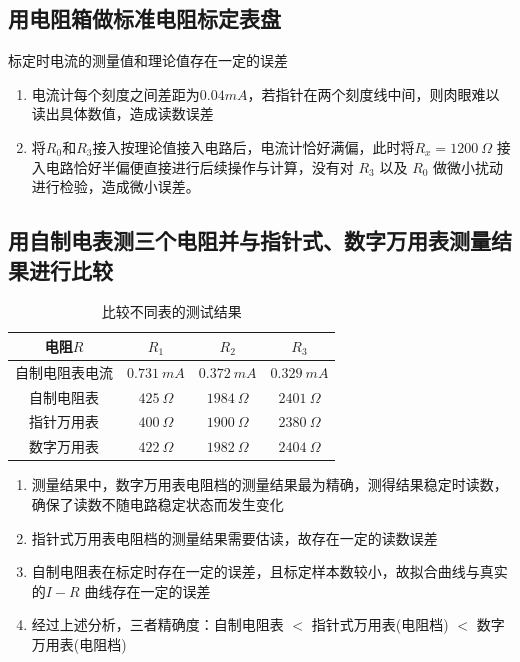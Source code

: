 \documentclass[UTF8]{ctexart}
\begin{document}
\subsection{用电阻箱做标准电阻标定表盘}
标定时电流的测量值和理论值存在一定的误差
\begin{enumerate}
    \item 电流计每个刻度之间差距为$0.04mA$，若指针在两个刻度线中间，则肉眼难以读出具体数值，造成读数误差
    \item 将$R_0$和$R_3$接入按理论值接入电路后，电流计恰好满偏，此时将$R_x =1200 \ \Omega$ 接入电路恰好半偏便直接进行后续操作与计算，没有对 $R_3$ 以及 $R_0$ 做微小扰动进行检验，造成微小误差。 
\end{enumerate}




\subsection{用自制电表测三个电阻并与指针式、数字万用表测量结果进行比较}
\begin{table}[H]
    \centering
    \caption*{比较不同表的测试结果}
    \begin{tabular}{|c|c|c|c|}
    \hline
      电阻$R$ &  $R_1$   &  $R_2$  &  $R_3$  \\
     \hline
     自制电阻表电流  &  $0.731\ mA$  & $0.372\ mA$  & $0.329\ mA$ \\
     \hline
     自制电阻表   & $425 \ \Omega$  & $1984 \ \Omega$ &  $2401 \ \Omega$ \\
     \hline
     指针万用表  &  $400 \ \Omega$  &  $1900\ \Omega$  & $2380\ \Omega$  \\
     \hline
     数字万用表  &  $422\ \Omega$  & $1982\ \Omega$  &  $2404\ \Omega$  \\
     \hline
    \end{tabular}
\end{table}
\begin{enumerate}
    \item 测量结果中，数字万用表电阻档的测量结果最为精确，测得结果稳定时读数，确保了读数不随电路稳定状态而发生变化
    \item 指针式万用表电阻档的测量结果需要估读，故存在一定的读数误差
    \item 自制电阻表在标定时存在一定的误差，且标定样本数较小，故拟合曲线与真实的$I-R$ 曲线存在一定的误差
    \item 经过上述分析，三者精确度：自制电阻表 $<$ 指针式万用表(电阻档) $<$ 数字万用表(电阻档)
\end{enumerate}
\end{document}
